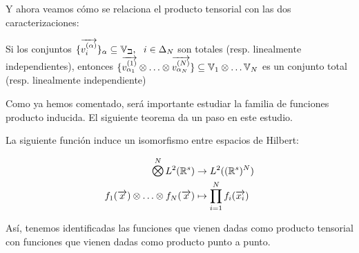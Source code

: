 Y ahora veamos cómo se relaciona el producto tensorial con las dos caracterizaciones:

\begin{proposicion}
    Si los conjuntos $\{\overrightarrow{v_i^{(\alpha)}}\}_{\alpha} \subseteq \mathbb{V_i}, \ \  i \in \Delta_{N}$ son totales (resp. linealmente independientes), entonces $\{ \overrightarrow{v^{(1)}_{\alpha_1}} \otimes \ldots \otimes  \overrightarrow{v^{(N)}_{\alpha_N}}  \} \subseteq \mathbb{V}_1 \otimes \ldots \mathbb{V}_N$ es un conjunto total (resp. linealmente independiente)
\end{proposicion}

Como ya hemos comentado, será importante estudiar la familia de funciones producto inducida. El siguiente teorema da un paso en este estudio.

\begin{teorema}
    La siguiente función induce un isomorfismo entre espacios de Hilbert:

    \begin{equation}
    \begin{split}
        \MediumOtimes^{N} L^2(\R^s) &\to L^2((\R^s)^N) \\
        f_1(\nv{x}) \otimes \ldots \otimes f_N(\nv{x}) &\mapsto \prod_{i = 1}^N f_i(\nv{x_i})
    \end{split}
    \end{equation}

    Así, tenemos identificadas las funciones que vienen dadas como producto tensorial con funciones que vienen dadas como producto punto a punto.
\end{teorema}


